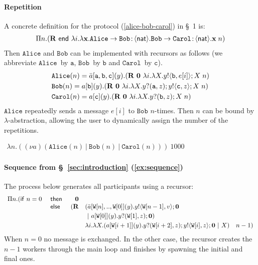 \documentclass{LMCS}
\newcommand{\kf}[1]{\textup{\textsf{#1}}\xspace}
\newcommand{\sr}[4]{\ensuremath{\bar{#1}[#2](#3).#4}}
\newcommand{\ssa}[4]{\ensuremath{#1[#2](#3).#4}}
\newcommand{\e}{\ensuremath{e}}
\newcommand{\participant}[1]{\ensuremath{\mathtt{#1}}}
\newcommand{\z}{\ensuremath{z}}
\newcommand{\pc}{\Par}
\newcommand{\X}{\ensuremath{X}}
\newcommand{\Pifthenelse}[3]{\ensuremath{\kf{if}\ #1\ \kf{then}\ #2\ \kf{else}\ #3}}
\newcommand{\inact}{\ensuremath{\mathbf{0}}}
\newcommand{\nuc}[2]{\ensuremath{(\nu #1)#2}}
\newcommand{\Par}{\ensuremath{\ |\ }}
\newcommand{\RECSEQ}[4]{\ensuremath{\mathbf{R} \ #1\ \lambda #2.\lambda #3.#4}}
\newcommand{\RECSEQP}[4]{\ensuremath{\mathbf{R} \ #1\ \lambda #2.\lambda #3.#4}}
\newcommand{\End}{\kf{end}}
\newcommand{\Nat}{\kf{nat}}
\newcommand{\outS}[3]{\ensuremath{#1!\langle #2\rangle;#3}}
\newcommand{\inpS}[3]{\ensuremath{#1?( #2);#3}}
\newcommand{\ENCan}[1]{\langle #1 \rangle}
\newcommand{\TO}[2]{#1\to #2}
\newcommand{\GS}[3]{\TO{#1}{#2}\colon \!\ENCan{#3}}
\newcommand{\APP}{\;}
\newcommand{\y}{\ensuremath{y}}
\newcommand{\Ia}{\ensuremath{a}}
\newcommand{\ii}{\ensuremath{i}}
\newcommand{\nn}{\ensuremath{n}}
\newcommand{\xx}{\ensuremath{\mathbf{x}}}
\newcommand{\Alice}{\ensuremath{\mathtt{Alice}}}
\newcommand{\Bob}{\ensuremath{\mathtt{Bob}}}
\newcommand{\Carol}{\ensuremath{\mathtt{Carol}}}
\newcommand{\W}{\ensuremath{\mathtt{W}}}
\begin{document}
\paragraph{\bf Repetition}
A concrete definition for the protocol (\ref{alice-bob-carol}) in \S~1 
is:
\[
\begin{array}{l}
\Pi n.(\RECSEQ{\End}{i}{\xx}{}\GS{\Alice}{\Bob}{\Nat}.
\GS{\Bob}{\Carol}{\Nat}.\xx \APP n)
\end{array}
\]
Then $\Alice$ and $\Bob$ 
can be implemented
with recursors as follows (we abbreviate 
\Alice~by $\participant{a}$, \Bob~by $\participant{b}$ and 
\Carol~by $\participant{c}$). 
\[
\begin{array}{lll}
\Alice(\nn) = \sr{a}{\participant{a},\participant{b},\participant{c}}
\y(\RECSEQP{\inact}{\ii}{\X}{\outS{\y}{\participant{b},\e[i]}}\X\APP n)\\[1mm]
\Bob(\nn) = \ssa{a}{\participant{b}}
\y(\RECSEQP{\inact}{\ii}{\X}{\inpS{y}{\participant{a},z}\outS{\y}{\participant{c},\z}}\X\APP
n)\\[1mm]
\Carol(\nn) = \ssa{a}{\participant{c}}
\y(\RECSEQP{\inact}{\ii}{\X}{\inpS{\y}{\participant{b},z}}\X\APP n)
\end{array}
\]
$\Alice$ repeatedly sends a message $e[i]$ to $\Bob$ $n$-times.
Then $\nn$ can be bound by $\lambda$-abstraction, allowing 
the user to dynamically assign the number of the repetitions.  
\begin{center}
{\small
$
\begin{array}{l}
\lambda \nn.(\nuc{\Ia}{(\Alice(\nn) \pc \Bob(\nn) \pc
\Carol(\nn))}) \ 1000
\end{array}
$}
\end{center}
\paragraph{\bf Sequence from \S~\ref{sec:introduction} (\ref{ex:sequence})}
The process below generates all participants using a recursor:
{\small
\[
\begin{array}{llrlll}
\Pi \nn.(\Pifthenelse{\nn=0 & }{ & \inact & \\
& }{ &(\mathbf{R} &
(\sr{a}{\W[\nn],..,\W[0]}{y}{\outS{\y}{\W[\nn-1],v}\inact}
\\[1mm]
& & & \pc \ssa{a}{\W[0]}{y}{\inpS{y}{\W[1],z}{\inact}})\\[1mm]
& & & \lambda {\ii}.\lambda{\X}.(
\ssa{a}{\W[\ii+1]}{y}{\inpS{y}{\W[\ii+2],z}\outS{\y}{\W[\ii],z}\inact \pc X}) {\quad \nn-1})}
\end{array}
\]}
\noindent When $n=0$ no message is exchanged. In the other case, the recursor
creates the $n-1$ workers through the main loop and finishes by spawning the initial and final ones.
\end{document}
